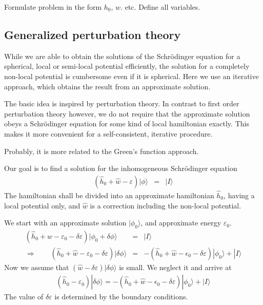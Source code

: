 \documentclass[11pt,a4paper]{report}
\begin{document}
Formulate problem in the form $h_0$, $w$. etc. Define all variables.
\subsection{Generalized perturbation theory}
\label{sec:gpt}
While we are able to obtain the solutions of the Schr\"odinger
equation for a spherical, local or semi-local potential efficiently,
the solution for a completely non-local potential is cumbersome even
if it is spherical. Here we use an iterative approach, which obtains
the result from an approximate solution. 

The basic idea is inspired by perturbation theory.  In contrast to
first order perturbation theory however, we do not require that the
approximate solution obeys a Schr\"odinger equation for some kind of
local hamiltonian exactly. This makes it more convenient for a
self-consistent, iterative procedure.

Probably, it is more related to the Green's function approach.

Our goal is to find a solution for the inhomogeneous Schr\"odinger
equation
\begin{eqnarray*}
\left(\hat{h}_0+\hat{w}-\varepsilon\right)
|\phi\rangle&=&|I\rangle
\end{eqnarray*}
The hamiltonian shall be divided into an approximate hamiltonian
$\hat{h}_0$, having a local potential only, and $\hat{w}$ is a
correction including the non-local potential.

We start with an approximate solution $|\phi_0\rangle$, and
approximate energy $\varepsilon_0$. 
\begin{eqnarray*}
\left(\hat{h}_0+\hat{w}-\varepsilon_0-\delta\varepsilon\right)
|\phi_0+\delta\phi\rangle&=&|I\rangle
\\
\Rightarrow\qquad
\left(\hat{h}_0+\hat{w}-\varepsilon_0-\delta\varepsilon\right)
|\delta\phi\rangle
&=&-\left(\hat{h}_0+\hat{w}-\epsilon_0-\delta\varepsilon\right)
|\phi_0\rangle
+|I\rangle
\end{eqnarray*}
Now we assume that $(\hat{w}-\delta\varepsilon)|\delta\phi\rangle$
is small. We neglect it and arrive at
\begin{eqnarray*}
\left(\hat{h}_0-\varepsilon_0\right)
|\delta\phi\rangle
=-\left(\hat{h}_0+\hat{w}-\epsilon_0-\delta\varepsilon\right)
|\phi_0\rangle
+|I\rangle
\end{eqnarray*}
The value of $\delta\varepsilon$ is determined by the boundary
conditions. 
\end{document}
